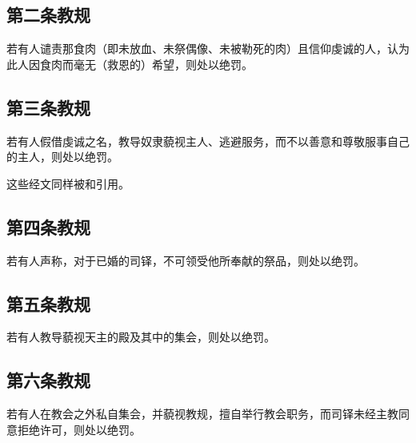 \subsection{第二条教规}

若有人谴责那食肉（即未放血、未祭偶像、未被勒死的肉）且信仰虔诚的人，认为此人因食肉而毫无（救恩的）希望，则处以绝罚。\par


\subsection{第三条教规}

若有人假借虔诚之名，教导奴隶藐视主人、逃避服务，而不以善意和尊敬服事自己的主人，则处以绝罚。\par

\newline{}这些经文同样被和引用。\par


\subsection{第四条教规}

若有人声称，对于已婚的司铎，不可领受他所奉献的祭品，则处以绝罚。\par


\subsection{第五条教规}

若有人教导藐视天主的殿及其中的集会，则处以绝罚。\par


\subsection{第六条教规}

若有人在教会之外私自集会，并藐视教规，擅自举行教会职务，而司铎未经主教同意拒绝许可，则处以绝罚。\par

